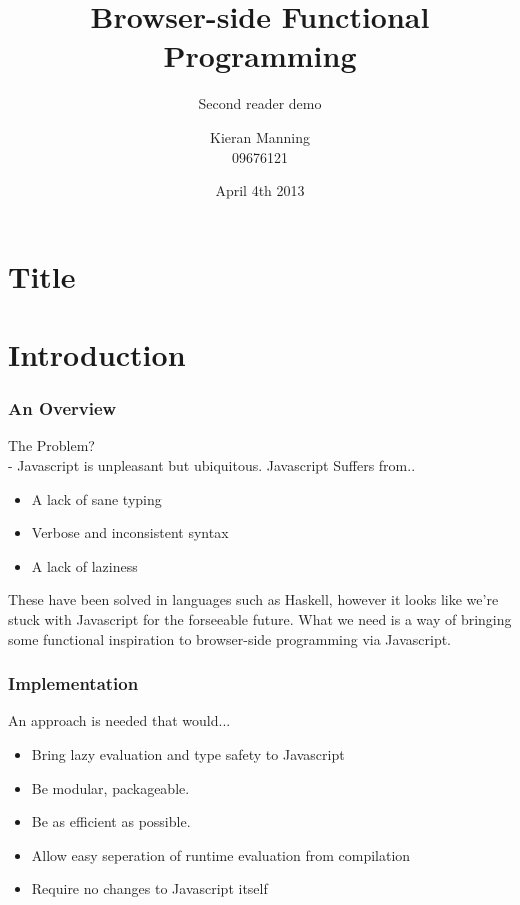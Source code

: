 \documentclass{beamer}
\title{Browser-side Functional Programming}
\subtitle{Second reader demo}
\date{April 4th 2013}
\author{Kieran Manning \\ 09676121}
\begin{document}
\section{Title}

\frame{\titlepage}

\section{Introduction}
\begin{frame}
	\frametitle{An Overview}
	The Problem? \\
	- Javascript is unpleasant but ubiquitous. Javascript 
	Suffers from..
	\begin{itemize}
		\item A lack of sane typing
		\item Verbose and inconsistent syntax
		\item A lack of laziness
	\end{itemize}
	These have been solved in languages such as Haskell, however
	it looks like we're stuck with Javascript for the forseeable 
	future. What we need is a way of bringing some functional
	inspiration to browser-side programming via Javascript.
\end{frame}

\begin{frame}
	\frametitle{Implementation}
	An approach is needed that would...
	\begin{itemize}
		\item Bring lazy evaluation and type safety to Javascript
		\item Be modular, packageable.
		\item Be as efficient as possible.
		\item Allow easy seperation of runtime evaluation from 
		  	  compilation
		\item Require no changes to Javascript itself
	\end{itemize}
\end{frame}
\end{document}
